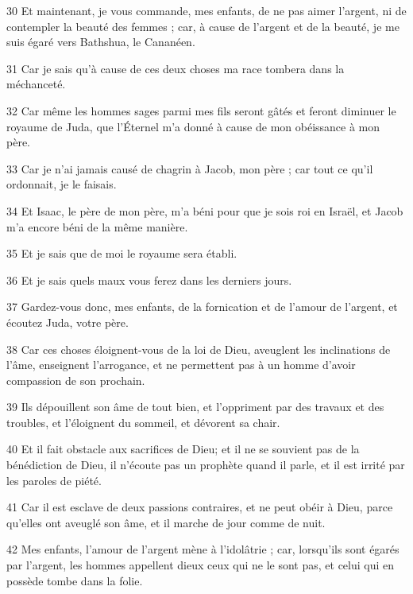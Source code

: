 \par 30 Et maintenant, je vous commande, mes enfants, de ne pas aimer l'argent, ni de contempler la beauté des femmes ; car, à cause de l'argent et de la beauté, je me suis égaré vers Bathshua, le Cananéen.

\par 31 Car je sais qu'à cause de ces deux choses ma race tombera dans la méchanceté.

\par 32 Car même les hommes sages parmi mes fils seront gâtés et feront diminuer le royaume de Juda, que l'Éternel m'a donné à cause de mon obéissance à mon père.

\par 33 Car je n'ai jamais causé de chagrin à Jacob, mon père ; car tout ce qu'il ordonnait, je le faisais.

\par 34 Et Isaac, le père de mon père, m'a béni pour que je sois roi en Israël, et Jacob m'a encore béni de la même manière.

\par 35 Et je sais que de moi le royaume sera établi.

\par 36 Et je sais quels maux vous ferez dans les derniers jours.

\par 37 Gardez-vous donc, mes enfants, de la fornication et de l'amour de l'argent, et écoutez Juda, votre père.

\par 38 Car ces choses éloignent-vous de la loi de Dieu, aveuglent les inclinations de l'âme, enseignent l'arrogance, et ne permettent pas à un homme d'avoir compassion de son prochain.

\par 39 Ils dépouillent son âme de tout bien, et l'oppriment par des travaux et des troubles, et l'éloignent du sommeil, et dévorent sa chair.

\par 40 Et il fait obstacle aux sacrifices de Dieu; et il ne se souvient pas de la bénédiction de Dieu, il n'écoute pas un prophète quand il parle, et il est irrité par les paroles de piété.

\par 41 Car il est esclave de deux passions contraires, et ne peut obéir à Dieu, parce qu'elles ont aveuglé son âme, et il marche de jour comme de nuit.

\par 42 Mes enfants, l'amour de l'argent mène à l'idolâtrie ; car, lorsqu'ils sont égarés par l'argent, les hommes appellent dieux ceux qui ne le sont pas, et celui qui en possède tombe dans la folie.


